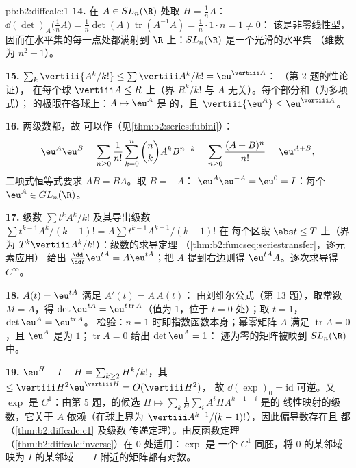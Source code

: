 \begin{solution}{pb:b2:diffcalc:1}
\textbf{14.} 在 $A \in SL_n(\R)$ 处取 $H = \frac1nA$：
$\dd(\det)_A\bigl(\tfrac1nA\bigr) = \frac1n\det(A)
\operatorname{tr}(A^{-1}A) = \frac1n\cdot1\cdot n = 1 \neq 0$：
该是非零线性型，因而在水平集的每一点处都满射到
$\R$ 上：$SL_n(\R)$ 是一个光滑的水平集
（维数为 $n^2 - 1$）。

\textbf{15.} $\sum_k\vertiii{A^k/k!} \leq
\sum\vertiii A^k/k! = \eu^{\vertiii A}$：
（第 2 题的性论证），
在每个球 $\vertiii A \leq R$ 上（界 $R^k/k!$ 与
$A$ 无关）。每个部分和（为多项式）；
的极限在各球上：$A \mapsto \eu^A$ 是
的，且 $\vertiii{\eu^A} \leq \eu^{\vertiii A}$。

\textbf{16.} 两级数都，故
可以作（见\cref{thm:b2:series:fubini}）：
\[
\eu^A\eu^B = \sum_{n\geq0}\frac{1}{n!}\sum_{k=0}^n\binom
nkA^kB^{n-k}
= \sum_{n\geq0}\frac{(A+B)^n}{n!} = \eu^{A+B},
\]
二项式恒等式要求 $AB = BA$。取 $B = -A$：
$\eu^A\eu^{-A} = \eu^0 = I$：每个 $\eu^A \in GL_n(\R)$。

\textbf{17.} 级数 $\sum t^kA^k/k!$ 及其导出级数
$\sum t^{k-1}A^k/(k-1)! = A\sum t^{k-1}A^{k-1}/(k-1)!$ 在
每个区段 $\abs t \leq T$ 上（界为
$T^k\vertiii A^k/k!$）：级数的求导定理
（\cref{thm:b2:funcseq:seriestransfer}，逐元素应用）
给出 $\frac{\dd}{\dd t}\eu^{tA} = A\eu^{tA}$；把 $A$
提到右边则得 $\eu^{tA}A$。逐次求导得 $C^\infty$。

\textbf{18.} $A(t) = \eu^{tA}$ 满足 $A'(t) = A\,A(t)$：
由刘维尔公式（第 13 题），取常数 $M = A$，得
$\det\eu^{tA} = \eu^{t\operatorname{tr}A}$（值为 $1$，位于 $t =
0$ 处）；取 $t = 1$，$\det\eu^A = \eu^{\operatorname{tr}A}$。
检验：$n = 1$ 时即指数函数本身；幂零矩阵 $A$ 满足
$\operatorname{tr}A = 0$，且 $\eu^A$ 是为
$1$；$\operatorname{tr}A = 0$ 给出 $\det\eu^A = 1$：
迹为零的矩阵被映到 $SL_n(\R)$ 中。

\textbf{19.} $\eu^H - I - H = \sum_{k\geq2}H^k/k!$，其
$\leq \vertiii H^2\eu^{\vertiii H} = O(\vertiii H^2)$，
故 $\dd(\exp)_0 = \mathrm{id}$ 可逆。又 $\exp$ 是
$C^1$：由第 5 题，的候选 $H \mapsto
\sum_k\frac1{k!}\sum_iA^iHA^{k-1-i}$ 是的
线性映射的级数，它关于 $A$ 依赖（在球上界为
$\vertiii A^{k-1}/(k-1)!$），因此偏导数存在且
都（\cref{thm:b2:diffcalc:c1} 及级数
传递定理）。由反函数定理
（\cref{thm:b2:diffcalc:inverse}）在 $0$ 处适用：$\exp$ 是
一个 $C^1$ 同胚，将 $0$ 的某邻域
映为 $I$ 的某邻域——$I$ 附近的矩阵都有对数。


\end{solution}
